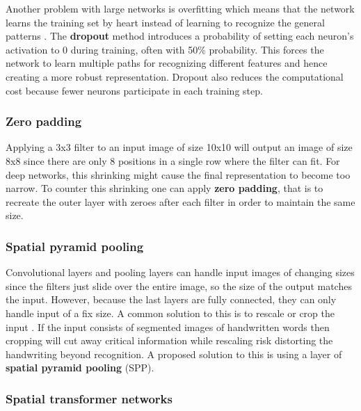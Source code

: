 Another problem with large networks is overfitting which means that the network learns the training set by heart instead of learning to recognize the general patterns \cite{AlexNet, FornesCnnCategorization}. The \textbf{dropout} method introduces a probability of setting each neuron's activation to $0$ during training, often with 50\% probability. This forces the network to learn multiple paths for recognizing different features and hence creating a more robust representation. Dropout also reduces the computational cost because fewer neurons participate in each training step.

\subsubsection{Zero padding}

Applying a 3x3 filter to an input image of size 10x10 will output an image of size 8x8 since there are only 8 positions in a single row where the filter can fit. For deep networks, this shrinking might cause the final representation to become too narrow. To counter this shrinking one can apply \textbf{zero padding}, that is to recreate the outer layer with zeroes after each filter in order to maintain the same size.

\subsubsection{Spatial pyramid pooling}

Convolutional layers and pooling layers can handle input images of changing sizes since the filters just slide over the entire image, so the size of the output matches the input.
However, because the last layers are fully connected, they can only handle input of a fix size. A common solution to this is to rescale or crop the input \cite{FornesCnnCategorization}. If the input consists of segmented images of handwritten words then cropping will cut away critical information while rescaling risk distorting the handwriting beyond recognition. A proposed solution to this is using a layer of \textbf{spatial pyramid pooling} (SPP).

\subsubsection{Spatial transformer networks}


